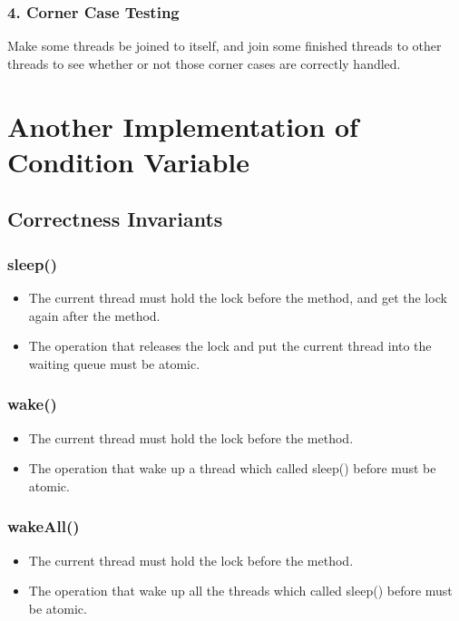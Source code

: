 \documentclass{article}
\begin{document}
	\subsubsection*{4. Corner Case Testing}
	Make some threads be joined to itself, and join some finished threads to other threads to see whether or not those corner cases are correctly handled.
	
	\section{Another Implementation of Condition Variable}
	
	\subsection{Correctness Invariants}
	
	\subsubsection*{sleep()}
	\begin{itemize}
		\item The current thread must hold the lock before the method, and get the lock again after the method.
		
		\item The operation that releases the lock and put the current thread into the waiting queue  must be atomic.
	\end{itemize}
	
	\subsubsection*{wake()}
	\begin{itemize}
		\item The current thread must hold the lock before the method.
			
		\item The operation that wake up a thread which called sleep() before must be atomic.
	\end{itemize}
	
	\subsubsection*{wakeAll()}
	\begin{itemize}
		\item The current thread must hold the lock before the method.
		
		\item The operation that wake up all the threads which called sleep() before must be atomic.
	\end{itemize}
	
\end{document}

